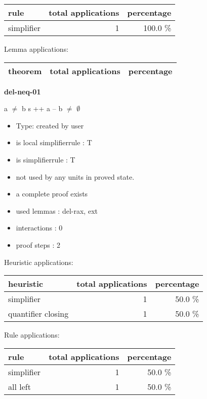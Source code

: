 \documentclass[a4paper]{article}
\begin{document}
\begin{supertabular}{l|r|r}
rule	        & total applications & percentage \\ \hline
simplifier & 1 & 100.0 \% \\

\end{supertabular}

Lemma applications:

\begin{supertabular}{l|r|r}
theorem	        & total applications & percentage \\ \hline

\end{supertabular}
\pagebreak

{\LARGE\bf del-neq-01}\label{lemma-del-neq-01}

\medskip

 \Fol a $\neq$ b \Imp s ++ a -- b $\neq$ $\emptyset$

\begin{itemize}

\item Type: created by user

\item is local simplifierrule : T
\item is simplifierrule : T
\item not used by any units in proved state.
\item       a complete proof exists
\item       used lemmas  : del-rax, ext
\item       interactions : 0
\item       proof steps  : 2
\end{itemize}

\medskip


Heuristic applications:

\begin{supertabular}{l|r|r}
heuristic	& total applications & percentage \\ \hline
simplifier & 1 & 50.0 \% \\
quantifier closing & 1 & 50.0 \% \\

\end{supertabular}

Rule applications:

\begin{supertabular}{l|r|r}
rule	        & total applications & percentage \\ \hline
simplifier & 1 & 50.0 \% \\
all left & 1 & 50.0 \% \\

\end{supertabular}
\end{document}
